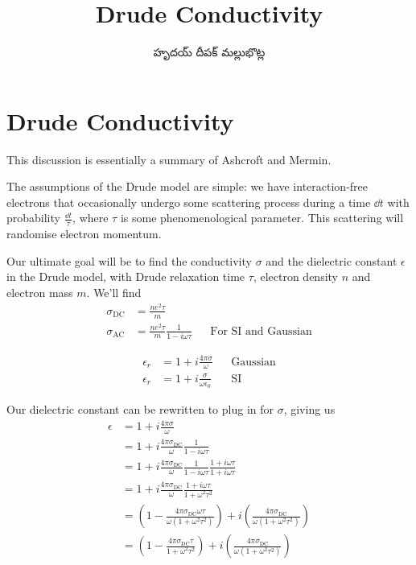 \documentclass[../main.tex]{subfiles}
\title{Drude Conductivity}
\author{\begin{telugu}హృదయ్ దీపక్ మల్లుభొట్ల\end{telugu}}
\date{}
\newcommand{\sigmaDC}{\sigma_{\textrm{DC}}}
\newcommand{\sigmaAC}{\sigma_{\textrm{AC}}}
\begin{document}
	\onlyinsubfile{\maketitle}
	\section{Drude Conductivity} \label{sec:DrudeConductivity}

	This discussion is essentially a summary of Ashcroft and Mermin\cite{Ashcroft}.

	The assumptions of the Drude model are simple: we have interaction-free electrons that occasionally undergo some scattering process during a time $\dd{t}$ with probability $\frac{\dd{t}}{\tau}$, where $\tau$ is some phenomenological parameter.
	This scattering will randomise electron momentum.

	Our ultimate goal will be to find the conductivity $\sigma$ and the dielectric constant $\epsilon$ in the Drude model, with Drude relaxation time $\tau$, electron density $n$ and electron mass $m$.
	We'll find
	\begin{align}
		\sigmaDC &= \frac{n e^2 \tau}{m} \\
		\sigmaAC &= \frac{n e^2 \tau}{m} \frac{1}{1 - i \omega \tau} && \text{For SI and Gaussian} \label{eq:DrudeTheory:SigmaAC}
	\end{align}

	\begin{subequations}
		\begin{align}
			\epsilon_r &= 1 + i \frac{4 \pi \sigma}{\omega} && \text{Gaussian} \\
			\epsilon_r &= 1 + i \frac{\sigma}{\omega \epsilon_0} && \text{SI}
		\end{align}
	\end{subequations}

	Our dielectric constant can be rewritten to plug in for $\sigma$, giving us
	\begin{align}
		\epsilon &= 1 + i \frac{4 \pi \sigma}{\omega} \\
		&= 1 + i \frac{4 \pi \sigmaDC}{\omega} \frac{1}{1 - i \omega \tau} \\
		&= 1 + i \frac{4 \pi \sigmaDC}{\omega} \frac{1}{1 - i \omega \tau} \frac{1 + i \omega\tau}{1 + i \omega \tau} \\
		&= 1 + i \frac{4 \pi \sigmaDC}{\omega} \frac{1 + i \omega \tau}{1 + \omega^2 \tau^2} \\
		&= \left(1 - \frac{4 \pi \sigmaDC \omega \tau}{\omega\left(1 + \omega^2 \tau^2 \right)} \right) + i \left( \frac{4 \pi \sigmaDC}{\omega \left( 1 + \omega^2 \tau^2 \right)} \right) \\
		&= \left(1 - \frac{4 \pi \sigmaDC  \tau}{1 + \omega^2 \tau^2 } \right) + i \left( \frac{4 \pi \sigmaDC}{\omega \left( 1 + \omega^2 \tau^2 \right)} \right)
	\end{align}
\end{document}
